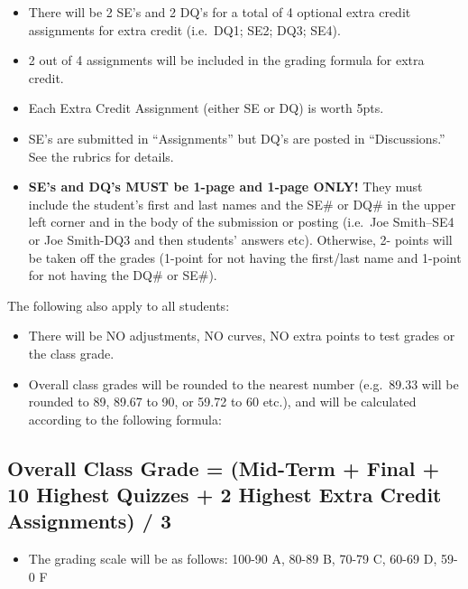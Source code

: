 \documentclass[11pt,]{article}
\providecommand{\tightlist}{%
  \setlength{\itemsep}{0pt}\setlength{\parskip}{0pt}}
\begin{document}
\begin{itemize}
\tightlist
\item
  There will be 2 SE's and 2 DQ's for a total of 4 optional extra credit assignments for extra
  credit (i.e.~DQ1; SE2; DQ3; SE4).
\item
  2 out of 4 assignments will be included in the grading formula for extra credit.
\item
  Each Extra Credit Assignment (either SE or DQ) is worth 5pts.
\item
  SE's are submitted in ``Assignments'' but DQ's are posted in ``Discussions.'' See the rubrics for
  details.
\item
  \textbf{SE's and DQ's MUST be 1-page and 1-page ONLY!} They must include the student's first and
  last names and the SE\# or DQ\# in the upper left corner and in the body of the submission or
  posting (i.e.~Joe Smith--SE4 or Joe Smith-DQ3 and then students' answers etc). Otherwise, 2-
  points will be taken off the grades (1-point for not having the first/last name and 1-point for not
  having the DQ\# or SE\#).
\end{itemize}

The following also apply to all students:

\begin{itemize}
\tightlist
\item
  There will be NO adjustments, NO curves, NO extra points to test grades or the class grade.
\item
  Overall class grades will be rounded to the nearest number (e.g.~89.33 will be rounded to 89, 89.67 to
  90, or 59.72 to 60 etc.), and will be calculated according to the following formula:
\end{itemize}

\hypertarget{overall-class-grade-mid-term-final-10-highest-quizzes-2-highest-extra-credit-assignments-3}{%
\subsection{Overall Class Grade = (Mid-Term + Final + 10 Highest Quizzes + 2 Highest Extra Credit Assignments) / 3}\label{overall-class-grade-mid-term-final-10-highest-quizzes-2-highest-extra-credit-assignments-3}}

\begin{itemize}
\tightlist
\item
  The grading scale will be as follows: 100-90 A, 80-89 B, 70-79 C, 60-69 D, 59-0 F
\end{itemize}
\end{document}
